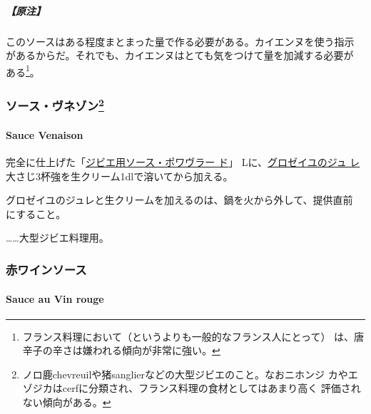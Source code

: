 \hypertarget{ux539fux6ce8-10}{%
\subparagraph{【原注】}\label{ux539fux6ce8-10}}

このソースはある程度まとまった量で作る必要がある。カイエンヌを使う指示
があるからだ。それでも、カイエンヌはとても気をつけて量を加減する必要が
ある\footnote{フランス料理において（というよりも一般的なフランス人にとって）
  は、唐辛子の辛さは嫌われる傾向が非常に強い。}。

\maeaki

\hypertarget{ux30bdux30fcux30b9ux30f4ux30cdux30beux30f395}{%
\subsubsection[ソース・ヴネゾン]{\texorpdfstring{ソース・ヴネゾン\footnote{ノロ鹿chevreuilや猪sanglierなどの大型ジビエのこと。なおニホンジ
  カやエゾジカはcerfに分類され、フランス料理の食材としてはあまり高く
  評価されない傾向がある。}}{ソース・ヴネゾン}}\label{ux30bdux30fcux30b9ux30f4ux30cdux30beux30f395}}

\hypertarget{sauce-venaison}{%
\paragraph{Sauce Venaison}\label{sauce-venaison}}

完全に仕上げた「\protect\hyperlink{sauce-poivrade-pour-gibier}{ジビエ用ソース・ポワヴラー
ド}」\troisquarts{} Lに、\href{}{グロゼイユのジュ
レ}大さじ3杯強を生クリーム1dlで溶いてから加える。

グロゼイユのジュレと生クリームを加えるのは、鍋を火から外して、提供直前
にすること。

\ldots{}\ldots{}大型ジビエ料理用。

\maeaki

\hypertarget{ux8d64ux30efux30a4ux30f3ux30bdux30fcux30b9}{%
\subsubsection{赤ワインソース}\label{ux8d64ux30efux30a4ux30f3ux30bdux30fcux30b9}}

\hypertarget{sauce-au-vin-rouge}{%
\paragraph{Sauce au Vin rouge}\label{sauce-au-vin-rouge}}

  

